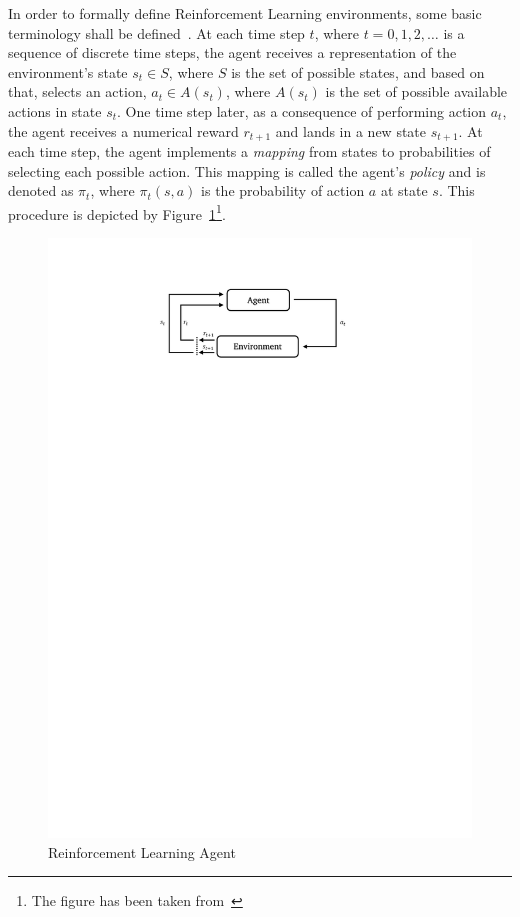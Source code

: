 In order to formally define Reinforcement Learning environments, some basic terminology shall be defined~\cite{rlIntro}. At each time step $t$, where $t = 0,1,2,\dots$ is a sequence of discrete time steps, the agent receives a representation of the environment's state $s_t \in S$, where $S$ is the set of possible states, and based on that, selects an action, $a_t \in A(s_t)$, where $A(s_t)$ is the
set of possible available actions in state $s_t$. One time step later, as a consequence of performing action $a_t$, the agent receives a numerical reward $r_{t+1}$ and lands in a new state $s_{t+1}$. At each time step, the agent implements a \emph{mapping} from states to probabilities of selecting each possible action. This mapping is called the agent's \emph{policy} and is denoted as $\pi_t$, where $\pi_t(s,a)$ is the probability of action $a$ at state $s$. This procedure is depicted by Figure~\ref{fig:rl}\footnote{The figure has been taken from~\textcite{rlIntro}}.
\begin{figure}[ht]
    \centering
    \includegraphics[clip,trim=4cm 23.5cm 4cm 2.5cm]{RL.pdf}
    \caption{Reinforcement Learning Agent}
    \label{fig:rl}
\end{figure}

